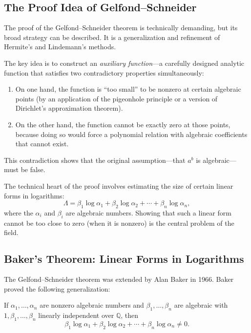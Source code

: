 \subsection{The Proof Idea of Gelfond--Schneider}

The proof of the Gelfond--Schneider theorem is technically demanding, but its broad strategy can be described. It is a generalization and refinement of Hermite's and Lindemann's methods.

The key idea is to construct an \emph{auxiliary function}---a carefully designed analytic function that satisfies two contradictory properties simultaneously:

\begin{enumerate}
    \item On one hand, the function is ``too small'' to be nonzero at certain algebraic points (by an application of the pigeonhole principle or a version of Dirichlet's approximation theorem).
    \item On the other hand, the function cannot be exactly zero at those points, because doing so would force a polynomial relation with algebraic coefficients that cannot exist.
\end{enumerate}

This contradiction shows that the original assumption---that $a^b$ is algebraic---must be false.

The technical heart of the proof involves estimating the size of certain linear forms in logarithms:
\[
    \Lambda = \beta_1 \log \alpha_1 + \beta_2 \log \alpha_2 + \cdots + \beta_n \log \alpha_n,
\]
where the $\alpha_i$ and $\beta_i$ are algebraic numbers. Showing that such a linear form cannot be too close to zero (when it is nonzero) is the central problem of the field.

\subsection{Baker's Theorem: Linear Forms in Logarithms}

The Gelfond--Schneider theorem was extended by Alan Baker in 1966. Baker proved the following generalization:

\begin{theorem}[Baker, 1966]\label{thm:baker}
If $\alpha_1, \ldots, \alpha_n$ are nonzero algebraic numbers and $\beta_1, \ldots, \beta_n$ are algebraic with $1, \beta_1, \ldots, \beta_n$ linearly independent over $\mathbb{Q}$, then\linebreak
\[
    \beta_1 \log \alpha_1 + \beta_2 \log \alpha_2 + \cdots + \beta_n \log \alpha_n \neq 0.
\]
\end{theorem}

